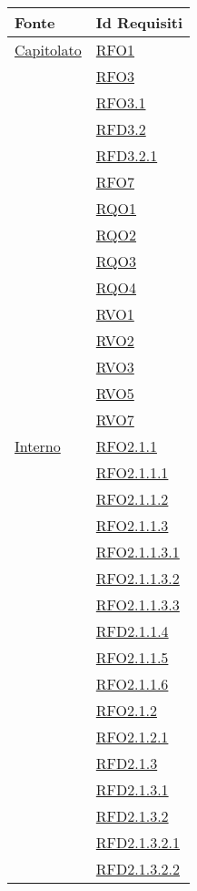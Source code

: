\normalsize
\begin{longtable}{|>{\centering}m{5cm}|m{5cm}<{\centering}|}
\hline
\textbf{Fonte} & \textbf{Id Requisiti}\\
\hline
\endhead
\hyperlink{Capitolato}{Capitolato} & \hyperlink{RFO1}{RFO1}\\
& \hyperlink{RFO3}{RFO3}\\
& \hyperlink{RFO3.1}{RFO3.1}\\
& \hyperlink{RFD3.2}{RFD3.2}\\
& \hyperlink{RFD3.2.1}{RFD3.2.1}\\
& \hyperlink{RFO7}{RFO7}\\
& \hyperlink{RQO1}{RQO1}\\
& \hyperlink{RQO2}{RQO2}\\
& \hyperlink{RQO3}{RQO3}\\
& \hyperlink{RQO4}{RQO4}\\
& \hyperlink{RVO1}{RVO1}\\
& \hyperlink{RVO2}{RVO2}\\
& \hyperlink{RVO3}{RVO3}\\
& \hyperlink{RVO5}{RVO5}\\
& \hyperlink{RVO7}{RVO7}\\ \hline
\hyperlink{Interno}{Interno} & \hyperlink{RFO2.1.1}{RFO2.1.1}\\
& \hyperlink{RFO2.1.1.1}{RFO2.1.1.1}\\
& \hyperlink{RFO2.1.1.2}{RFO2.1.1.2}\\
& \hyperlink{RFO2.1.1.3}{RFO2.1.1.3}\\
& \hyperlink{RFO2.1.1.3.1}{RFO2.1.1.3.1}\\
& \hyperlink{RFO2.1.1.3.2}{RFO2.1.1.3.2}\\
& \hyperlink{RFO2.1.1.3.3}{RFO2.1.1.3.3}\\
& \hyperlink{RFD2.1.1.4}{RFD2.1.1.4}\\
& \hyperlink{RFO2.1.1.5}{RFO2.1.1.5}\\
& \hyperlink{RFO2.1.1.6}{RFO2.1.1.6}\\
& \hyperlink{RFO2.1.2}{RFO2.1.2}\\
& \hyperlink{RFO2.1.2.1}{RFO2.1.2.1}\\
& \hyperlink{RFD2.1.3}{RFD2.1.3}\\
& \hyperlink{RFD2.1.3.1}{RFD2.1.3.1}\\
& \hyperlink{RFD2.1.3.2}{RFD2.1.3.2}\\
& \hyperlink{RFD2.1.3.2.1}{RFD2.1.3.2.1}\\
& \hyperlink{RFD2.1.3.2.2}{RFD2.1.3.2.2}\\

\end{longtable}
